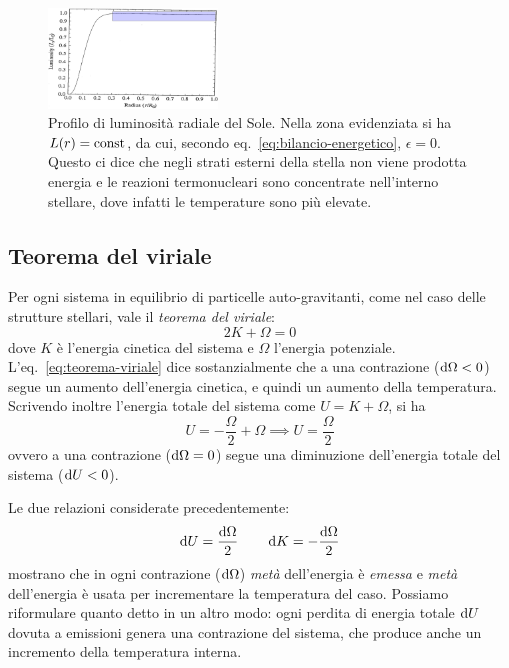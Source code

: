 \begin{figure}
\centering
\includegraphics[width=0.4\textwidth]{immagini/profilo-luminosita-radiale-sole.png}
\caption{Profilo di luminosità radiale del Sole. Nella zona evidenziata si ha $L(r) = \textup{const}$, da cui, secondo eq.~\eqref{eq:bilancio-energetico}, $\epsilon = 0$. Questo ci dice che negli strati esterni della stella non viene prodotta energia e le reazioni termonucleari sono concentrate nell'interno stellare, dove infatti le temperature sono più elevate.}
\label{fig:profilo-luminosità-sole}
\end{figure}

\subsection{Teorema del viriale}
Per ogni sistema in equilibrio di particelle auto-gravitanti, come nel caso delle strutture stellari, vale il \emph{teorema del viriale}:
\begin{equation}\label{eq:teorema-viriale}
    2K + \Omega = 0
\end{equation}
dove $K$ è l'energia cinetica del sistema e $\Omega$ l'energia potenziale. L'eq.~\eqref{eq:teorema-viriale} dice sostanzialmente che a una contrazione ($\mathop{\mathrm{{}d}}\mathopen{} \Omega < 0$) segue un aumento dell'energia cinetica, e quindi un aumento della temperatura. Scrivendo inoltre l'energia totale del sistema come $U = K + \Omega$, si ha
\[
U = - \frac{\Omega}{2} + \Omega \implies U = \frac{\Omega}{2}
\]
ovvero a una contrazione ($\mathop{\mathrm{{}d}}\mathopen{} \Omega = 0$) segue una diminuzione dell'energia totale del sistema ($\mathop{\mathrm{{}d}}\mathopen{} U < 0$).

Le due relazioni considerate precedentemente:
\begin{equation}\label{eq:viriale-differenziale}
\mathop{\mathrm{{}d}}\mathopen{} U = \frac{\mathop{\mathrm{{}d}}\mathopen{} \Omega}{2} \qquad \mathop{\mathrm{{}d}}\mathopen{} K = - \frac{\mathop{\mathrm{{}d}}\mathopen{} \Omega}{2}
\end{equation}
mostrano che in ogni contrazione ($\mathop{\mathrm{{}d}}\mathopen{} \Omega$) \emph{metà} dell'energia è \emph{emessa} e \emph{metà} dell'energia è usata per incrementare la temperatura del caso. Possiamo riformulare quanto detto in un altro modo: ogni perdita di energia totale $\mathop{\mathrm{{}d}}\mathopen{} U$ dovuta a emissioni genera una contrazione del sistema, che produce anche un incremento della temperatura interna.

